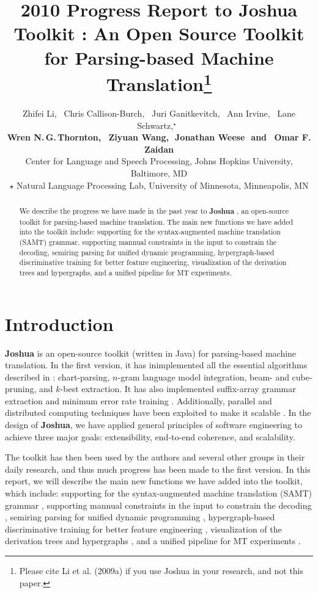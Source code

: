 \documentclass[11pt]{article}
\title{2010 Progress Report to Joshua Toolkit : An Open Source Toolkit for Parsing-based Machine Translation\thanks{ 
Please cite Li et al. (2009a) if you use Joshua in your research, and not this paper.}}
\author{
Zhifei Li,\,\,\,
Chris Callison-Burch,\,\,\,
Juri Ganitkevitch,\,\,\,
Ann Irvine,\,\,\, 
Lane Schwartz,$^\star$\,\,\, 
\\ {\bf
Wren N.\,G.\,Thornton,\,\,\,
Ziyuan Wang,\,\,
Jonathan Weese\,\,
{\textnormal{and}}
\,\,\,Omar F. Zaidan}\\
Center for Language and Speech Processing, Johns Hopkins University, Baltimore, MD\\
$\star$ Natural Language Processing Lab, University of Minnesota, Minneapolis, MN }
\date{}
\newcommand{\joshua}{\textbf{Joshua}}
\begin{document}
\maketitle
\begin{abstract}
We describe the progress we have made in the past year to \textbf{Joshua} \cite{joshua-wmt09}, 
an open-source toolkit for parsing-based machine translation.
The main new functions we have added into the toolkit include: supporting for the syntax-augmented machine translation (SAMT) grammar,
supporting mannual constraints in the input to constrain the decoding,  
semiring parsing for unified dynamic programming, hypergraph-based 
discriminative training for better feature engineering, visualization of the derivation
trees and hypergraphs, and a unified pipeline for MT experiments.
\end{abstract}


\listoftodos

\section{Introduction}

\textbf{Joshua} \cite{joshua-wmt09} is an open-source toolkit (written in Java) for parsing-based machine translation.
In the first version, it  has inimplemented all the essential algorithms described 
in : chart-parsing, $n$-gram language model integration, beam- and cube-pruning, and $k$-best extraction.  
It has also implemented suffix-array grammar extraction \cite{lopez:2007:EMNLP-CoNLL2007} 
and minimum error rate training \cite{och-mert}. 
Additionally, parallel and distributed computing techniques have been exploited 
to make it scalable \cite{Joshua-old}. In the design of \joshua, we have applied general
principles of software engineering to achieve three
major goals: extensibility, end-to-end coherence,
and scalability.

The toolkit has then been used by the authors and several
other groups in their daily research, and thus much progress has
been made to the first version. 
In this report, we will describe the main new functions we have added into the 
toolkit, which include: supporting for the syntax-augmented machine translation (SAMT) grammar \cite{???},
supporting mannual constraints in the input to constrain the decoding \cite{???},  
semiring parsing for unified dynamic programming \cite{li-eisner:2009:EMNLP}, 
hypergraph-based discriminative training for better feature engineering \cite{oracle-extraction-naacl09}, 
visualization of the derivation trees and hypergraphs \cite{???}, 
and a unified pipeline for MT experiments \cite{???}.
\end{document}
